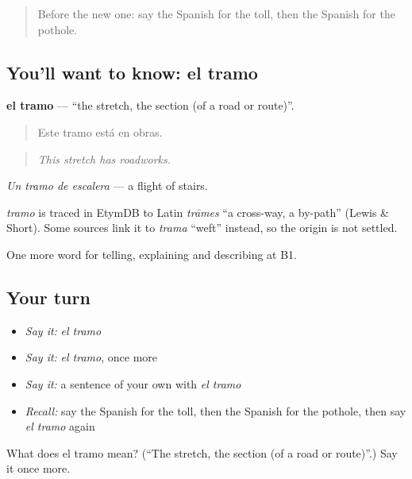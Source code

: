 \label{lesson:ES-C642-tramo}



\begin{quote}
Before the new one: say the Spanish for the toll, then the Spanish for the pothole.
\end{quote}

\subsection*{You'll want to know: el tramo}
\textbf{el tramo} — \textquotedblleft{}the stretch, the section (of a road or route)\textquotedblright{}.

\begin{quote}
Este tramo está en obras.
\end{quote}

\begin{quote}
\emph{This stretch has roadworks.}
\end{quote}

\emph{Un tramo de escalera} — a flight of stairs.

\begin{cousinweb}
\emph{tramo} is traced in EtymDB to Latin \emph{trāmes} \textquotedblleft{}a cross-way, a by-path\textquotedblright{} (Lewis \& Short). Some sources link it to \emph{trama} \textquotedblleft{}weft\textquotedblright{} instead, so the origin is not settled.
\end{cousinweb}

\begin{grammarlens}[title={What you've built}]
One more word for telling, explaining and describing at B1.
\end{grammarlens}

\subsection*{Your turn}
\begin{itemize}
\raggedright
  \item \emph{Say it:} \emph{el tramo}
  \item \emph{Say it:} \emph{el tramo}, once more
  \item \emph{Say it:} a sentence of your own with \emph{el tramo}
  \item \emph{Recall:} say the Spanish for the toll, then the Spanish for the pothole, then say \emph{el tramo} again
\end{itemize}

\begin{tcolorbox}[breakable,colback=teal!4,colframe=teal!35!black,title={Before you move on}]
What does el tramo mean? (\textquotedblleft{}The stretch, the section (of a road or route)\textquotedblright{}.) Say it once more.
\end{tcolorbox}
